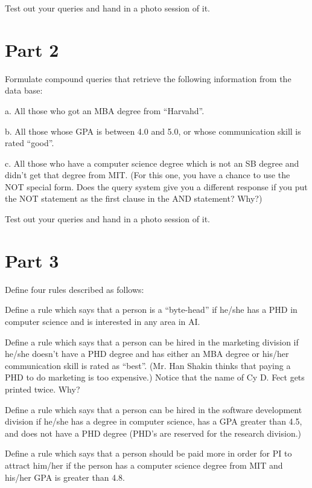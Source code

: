 Test out your queries and hand in a photo session of it.

\section{Part 2}

Formulate compound queries that retrieve the following information from
the data base:

\bpar a. All those who got an MBA degree from ``Harvahd''.

\bpar b. All those whose GPA is between 4.0 and 5.0, or whose communication
         skill is rated ``good''.  

\bpar c. All those who have a computer science degree which is not an
         SB degree and didn't get that degree from MIT.  (For this one,
         you have a chance to use the NOT special form.  Does the query
         system give you a different response if you put the NOT statement
         as the first clause in the AND statement?  Why?)

Test out your queries and hand in a photo session of it.

\section{Part 3}

Define four rules described as follows:

\bpar Define a rule which says that a person is a ``byte-head'' if
         he/she has a PHD in computer science and is interested in any
         area in AI.

\bpar  Define a rule which says that a person can be hired in the
        marketing division if he/she doesn't have a PHD degree and
         has either an MBA degree or his/her communication skill is
         rated as ``best''.  (Mr. Han Shakin thinks that paying a
         PHD to do marketing is too expensive.)  Notice that the
         name of Cy D. Fect gets printed twice.  Why?

\bpar  Define a rule which says that a person can be hired in the
         software development division if he/she has a degree in computer
         science, has a GPA greater than 4.5, and does not have a
         PHD degree (PHD's are reserved for the research division.)

\bpar  Define a rule which says that a person should be paid more
         in order for PI to attract him/her if the person has a computer
         science degree from MIT and his/her GPA is greater than 4.8.

